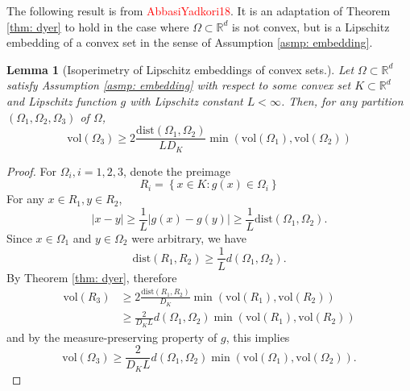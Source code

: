 \documentclass{article}
\newcommand{\Reals}{\mathbb{R}}
\newcommand{\abs}[1]{\left \lvert #1 \right \rvert}
\newcommand{\vol}{\mathrm{vol}}
\newcommand{\set}[1]{\left\{#1\right\}}
\newcommand{\dist}{\mathrm{dist}}
\newcommand{\Rd}{\Reals^d}
\newcommand{\1}{\mathbf{1}}
\theoremstyle{alden}
\theoremstyle{aldenthm}
\newtheorem{lemma}{Lemma}
\theoremstyle{remark}
\begin{document}
The following result is from \textcolor{red}{AbbasiYadkori18}. It is an adaptation of Theorem \ref{thm: dyer} to hold in the case where $\Omega \subset \Rd$ is not convex, but is a Lipschitz embedding of a convex set in the sense of Assumption \ref{asmp: embedding}.

\begin{lemma}[Isoperimetry of Lipschitz embeddings of convex sets.]
	Let $\Omega \subset \Rd$ satisfy Assumption \ref{asmp: embedding} with respect to some convex set $K \subset \Rd$ and Lipschitz function $g$ with Lipschitz constant $L <  \infty$. Then, for any partition $(\Omega_1,\Omega_2,\Omega_3)$ of $\Omega$, 
	\begin{equation*}
	\vol(\Omega_3) \geq 2\frac{\dist(\Omega_1, \Omega_2)}{L D_{K}} \min(\vol(\Omega_1), \vol(\Omega_2))
	\end{equation*}
\end{lemma}
\begin{proof}
	For $\Omega_i, i = 1,2,3$, denote the preimage
	\begin{equation*}
	R_i = \set{x \in K: g(x) \in \Omega_i}
	\end{equation*}
	For any $x \in R_1, y \in R_2$, 
	\begin{equation*}
	\abs{x - y} \geq \frac{1}{L}\abs{g(x) - g(y)} \geq \frac{1}{L} \dist(\Omega_1, \Omega_2). 
	\end{equation*}
	Since $x \in \Omega_1$ and $y \in \Omega_2$ were arbitrary, we have
	\begin{equation*}
	\dist(R_1, R_2) \geq \frac{1}{L} d(\Omega_1, \Omega_2).
	\end{equation*}
	By Theorem \ref{thm: dyer}, therefore
	\begin{align*}
	\vol(R_3) & \geq 2\frac{\dist(R_1, R_2)}{D_{K}} \min(\vol(R_1), \vol(R_2)) \\
	& \geq \frac{2}{D_{K} L} d(\Omega_1, \Omega_2) \min(\vol(R_1), \vol(R_2))
	\end{align*}
	and by the measure-preserving property of $g$, this implies
	\begin{equation*}
	\vol(\Omega_3) \geq\frac{2}{D_{K} L} d(\Omega_1, \Omega_2) \min(\vol(\Omega_1), \vol(\Omega_2)).
	\end{equation*}
\end{proof}
\end{document}
